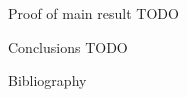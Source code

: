 \documentclass[12pt]{beamer}
\begin{document}
  \begin{frame}{Proof of main result}
    TODO
  \end{frame}

  \begin{frame}{Conclusions}
    TODO
  \end{frame}

  \begin{frame}{Bibliography}
    
  \end{frame}
\end{document}
